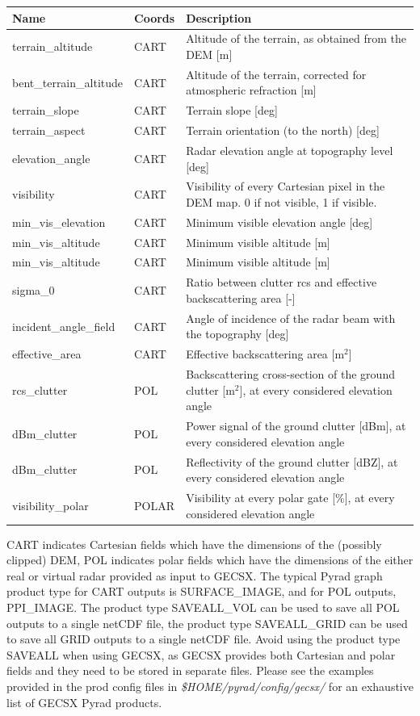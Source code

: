 \documentclass[a4paper,11pt,pdftex,twoside]{scrartcl}
\renewcommand{\bf}{\normalfont \bfseries}
\begin{document}
{{{\begin{longtable}{p{}p{}p{}}
\bf{Name}          & \bf{Coords} & \bf{Description}\\
\hline
terrain\_altitude & CART & Altitude of the terrain, as obtained from the DEM [m]\\
bent\_terrain\_altitude & CART & Altitude of the terrain, corrected for atmospheric refraction [m] \\
terrain\_slope & CART & Terrain slope [deg] \\
terrain\_aspect & CART & Terrain orientation (to the north) [deg]\\
elevation\_angle & CART & Radar elevation angle at topography level [deg] \\
visibility & CART & Visibility of every Cartesian pixel in the DEM map. 0 if not visible, 1 if visible.\\
min\_vis\_elevation & CART & Minimum visible elevation angle [deg] \\
min\_vis\_altitude & CART & Minimum visible altitude [m] \\
min\_vis\_altitude & CART & Minimum visible altitude [m] \\
sigma\_0 & CART & Ratio between clutter rcs and effective backscattering area [-] \\
incident\_angle\_field & CART & Angle of incidence of the radar beam with the topography [deg] \\
effective\_area & CART & Effective backscattering area [m$^2$] \\
rcs\_clutter & POL & Backscattering cross-section of the ground clutter [m$^2$], at every considered elevation angle\\
dBm\_clutter & POL & Power signal of the ground clutter [dBm], at every considered elevation angle\\
dBm\_clutter & POL & Reflectivity of the ground clutter [dBZ], at every considered elevation angle\\
visibility\_polar & POLAR & Visibility at every polar gate [\%], at every considered elevation angle\\
\end{longtable} 

CART indicates Cartesian fields which have the dimensions of the (possibly clipped) DEM, POL indicates polar fields which have the dimensions of the either real or virtual radar provided as input to GECSX. 
The typical Pyrad graph product type for CART outputs is SURFACE_IMAGE, and for POL outputs, PPI_IMAGE. The product type SAVEALL_VOL can be used to save all POL outputs to a single netCDF file, the product type SAVEALL_GRID can be used to save all GRID outputs to a single netCDF file. Avoid using the product type SAVEALL when using GECSX, as GECSX provides both Cartesian and polar fields and they need to be stored in separate files. Please see the examples provided in the prod config files in \textit{\$HOME/pyrad/config/gecsx/} for an exhaustive list of GECSX Pyrad products.

}}}
\end{document}
